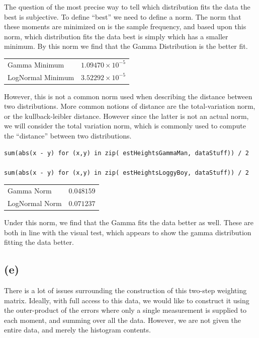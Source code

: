 \documentclass[12pt]{paper}
\begin{document}
The question of the most precise way to tell which distribution fits
the data the best is subjective. To define ``best'' we need to define
a norm. The norm that these moments are minimized on is the sample
frequency, and based upon this norm, which distribution fits the data
best is simply which has a smaller minimum. By this norm we find that
the Gamma Distribution is the better fit.

\vspace{.25in}
\begin{tabular}{ll}
  Gamma Minimum & $1.09470 \times 10^{-5}$\\
  LogNormal Minimum & $3.52292 \times 10^{-5}$\\
\end{tabular}
\vspace{.25in}

However, this is not a common norm used when describing the distance
between two distributions. More common notions of distance are the
total-variation norm, or the kullback-leibler
distance. However since the latter is not an actual norm, we will
consider the total variation norm, which is commonly used to compute
the ``distance'' between two distributions.

\begin{verbatim}
sum(abs(x - y) for (x,y) in zip( estHeightsGammaMan, dataStuff)) / 2

sum(abs(x - y) for (x,y) in zip( estHeightsLoggyBoy, dataStuff)) / 2
\end{verbatim}



\begin{tabular}{ll}
  Gamma Norm & $0.048159$\\
  LogNormal Norm & $0.071237$
\end{tabular}

\vspace{.25in}

Under this norm, we find that the Gamma fits the data better as
well. These are both in line with the visual test, which appears to
show the gamma distribution fitting the data better.


\subsection{(e)}

There is a lot of issues surrounding the construction of this two-step
weighting matrix. Ideally, with full access to this data, we would
like to construct it using the outer-product of the errors where only
a single measurement is supplied to each moment, and summing over all
the data. However, we are not given the entire data, and merely the
histogram contents.
\end{document}
